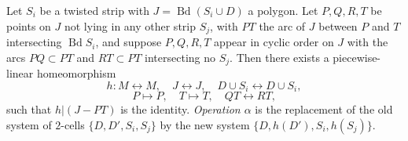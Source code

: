 Let $S_i$ be a twisted strip with $J = \operatorname{Bd}(S_i \cup D)$ a polygon. Let $P, Q, R, T$ be points on $J$ not lying in any other strip $S_j$, with $PT$ the arc of $J$ between $P$ and $T$ intersecting $\operatorname{Bd} S_i$, and suppose $P, Q, R, T$ appear in cyclic order on $J$ with the arcs $PQ \subset PT$ and $RT \subset PT$ intersecting no $S_j$. Then there exists a piecewise-linear homeomorphism
$$h: M \leftrightarrow M, \quad J \leftrightarrow J, \quad D \cup S_i \leftrightarrow D \cup S_i,$$
$$P \mapsto P, \quad T \mapsto T, \quad QT \leftrightarrow RT,$$
such that $h|(J - PT)$ is the identity. \emph{Operation $\alpha$} is the replacement of the old system of $2$-cells $\{D, D', S_i, S_j\}$ by the new system $\{D, h(D'), S_i, h(S_j)\}$.
